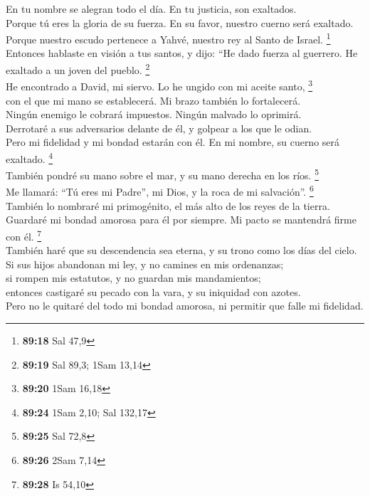  En tu nombre se alegran todo el día. En tu justicia, son
exaltados.\\
 Porque tú eres la gloria de su fuerza. En su favor,
nuestro cuerno será exaltado.\\
 Porque nuestro escudo pertenece a Yahvé, nuestro rey al
Santo de Israel. \footnote{\textbf{89:18} Sal 47,9}\\
 Entonces hablaste en visión a tus santos, y dijo: ``He
dado fuerza al guerrero. He exaltado a un joven del pueblo.
\footnote{\textbf{89:19} Sal 89,3; 1Sam 13,14}\\
 He encontrado a David, mi siervo. Lo he ungido con mi
aceite santo, \footnote{\textbf{89:20} 1Sam 16,18}\\
 con el que mi mano se establecerá. Mi brazo también lo
fortalecerá.\\
 Ningún enemigo le cobrará impuestos. Ningún malvado lo
oprimirá.\\
 Derrotaré a sus adversarios delante de él, y golpear a
los que le odian.\\
 Pero mi fidelidad y mi bondad estarán con él. En mi
nombre, su cuerno será exaltado. \footnote{\textbf{89:24} 1Sam 2,10; Sal
  132,17}\\
 También pondré su mano sobre el mar, y su mano derecha
en los ríos. \footnote{\textbf{89:25} Sal 72,8}\\
 Me llamará: ``Tú eres mi Padre'', mi Dios, y la roca de
mi salvación''. \footnote{\textbf{89:26} 2Sam 7,14}\\
 También lo nombraré mi primogénito, el más alto de los
reyes de la tierra.\\
 Guardaré mi bondad amorosa para él por siempre. Mi pacto
se mantendrá firme con él. \footnote{\textbf{89:28} Is 54,10}\\
 También haré que su descendencia sea eterna, y su trono
como los días del cielo.\\
 Si sus hijos abandonan mi ley, y no camines en mis
ordenanzas;\\
 si rompen mis estatutos, y no guardan mis
mandamientos;\\
 entonces castigaré su pecado con la vara, y su iniquidad
con azotes.\\
 Pero no le quitaré del todo mi bondad amorosa, ni
permitir que falle mi fidelidad.\\

